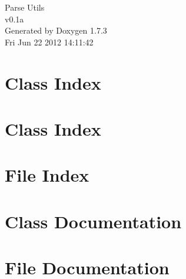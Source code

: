 \documentclass[a4paper]{book}
\begin{document}
\hypersetup{pageanchor=false}
\begin{titlepage}
\vspace*{7cm}
\begin{center}
{\Large Parse Utils \\[1ex]\large v0.1a }\\
\vspace*{1cm}
{\large Generated by Doxygen 1.7.3}\\
\vspace*{0.5cm}
{\small Fri Jun 22 2012 14:11:42}\\
\end{center}
\end{titlepage}
\clearemptydoublepage
{}
\tableofcontents
\clearemptydoublepage
{}
\hypersetup{pageanchor=true}
\chapter{Class Index}

\chapter{Class Index}

\chapter{File Index}

\chapter{Class Documentation}













\chapter{File Documentation}







































\printindex
\end{document}
